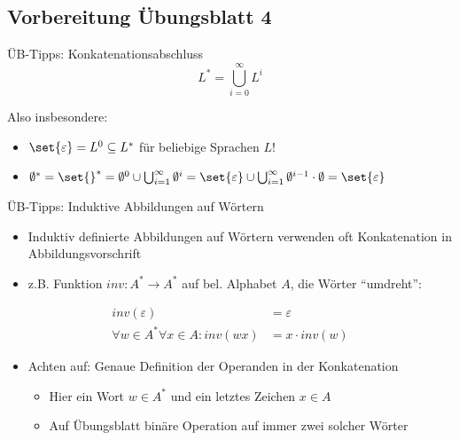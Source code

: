 \subsection{Vorbereitung Übungsblatt 4}
\begin{frame}{ÜB-Tipps: Konkatenationsabschluss}
    \[
    	L^\ast = \bigcup_{i = 0}^\infty L^i
    \]

    Also insbesondere:
    \begin{itemize}
    	\item $\set{\varepsilon} = L^0 \subseteq L^\ast$ für beliebige Sprachen $L$!
    	\item $\emptyset^\ast = \set{}^\ast = \emptyset^0 \cup \bigcup_{i = 1}^\infty \emptyset^i = \set{\varepsilon} \cup \bigcup_{i = 1}^\infty \emptyset^{i-1} \cdot \emptyset = \set{\varepsilon}$
    \end{itemize}
\end{frame}

\begin{frame}{ÜB-Tipps: Induktive Abbildungen auf Wörtern}
	
	\begin{itemize}
		\item Induktiv definierte Abbildungen auf Wörtern verwenden oft Konkatenation in Abbildungsvorschrift
		\item z.B. Funktion $inv : A^\ast \to A^\ast$ auf bel. Alphabet $A$, die Wörter \enquote{umdreht}:
	\end{itemize}
	\begin{align*}
		inv(\varepsilon) &= \varepsilon \\
		\forall w \in A^\ast \forall x \in A: inv(wx) &= x \cdot inv(w)
	\end{align*}
	\begin{itemize}
		\item Achten auf: Genaue Definition der Operanden in der Konkatenation \begin{itemize}
			\item Hier ein Wort $w \in A^\ast$ und ein letztes Zeichen $x \in A$
			\item Auf Übungsblatt binäre Operation auf immer zwei solcher Wörter
		\end{itemize}
	\end{itemize}

\end{frame}